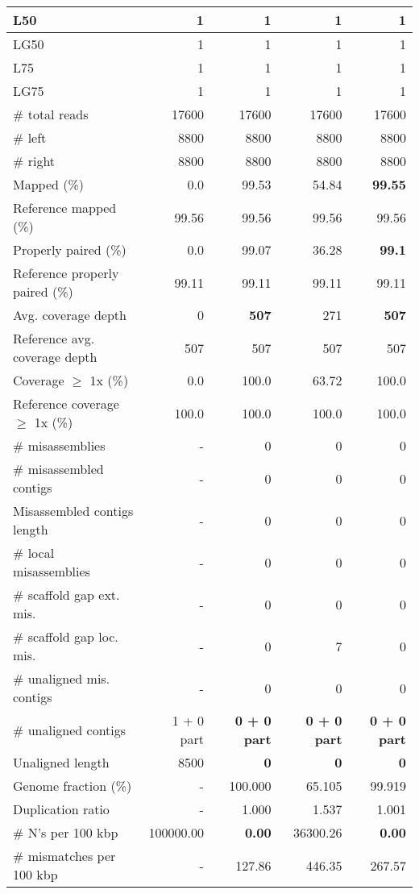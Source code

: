 \documentclass[12pt,a4paper]{article}
\begin{document}
\begin{table}[ht]
\begin{center}
\begin{tabular}{|l*{4}{|r}|}
L50 & 1 & 1 & 1 & 1 \\ \hline
LG50 & 1 & 1 & 1 & 1 \\ \hline
L75 & 1 & 1 & 1 & 1 \\ \hline
LG75 & 1 & 1 & 1 & 1 \\ \hline
\# total reads & 17600 & 17600 & 17600 & 17600 \\ \hline
\# left & 8800 & 8800 & 8800 & 8800 \\ \hline
\# right & 8800 & 8800 & 8800 & 8800 \\ \hline
Mapped (\%) & 0.0 & 99.53 & 54.84 & {\bf 99.55} \\ \hline
Reference mapped (\%) & 99.56 & 99.56 & 99.56 & 99.56 \\ \hline
Properly paired (\%) & 0.0 & 99.07 & 36.28 & {\bf 99.1} \\ \hline
Reference properly paired (\%) & 99.11 & 99.11 & 99.11 & 99.11 \\ \hline
Avg. coverage depth & 0 & {\bf 507} & 271 & {\bf 507} \\ \hline
Reference avg. coverage depth & 507 & 507 & 507 & 507 \\ \hline
Coverage $\geq$ 1x (\%) & 0.0 & 100.0 & 63.72 & 100.0 \\ \hline
Reference coverage $\geq$ 1x (\%) & 100.0 & 100.0 & 100.0 & 100.0 \\ \hline
\# misassemblies & - & 0 & 0 & 0 \\ \hline
\# misassembled contigs & - & 0 & 0 & 0 \\ \hline
Misassembled contigs length & - & 0 & 0 & 0 \\ \hline
\# local misassemblies & - & 0 & 0 & 0 \\ \hline
\# scaffold gap ext. mis. & - & 0 & 0 & 0 \\ \hline
\# scaffold gap loc. mis. & - & 0 & 7 & 0 \\ \hline
\# unaligned mis. contigs & - & 0 & 0 & 0 \\ \hline
\# unaligned contigs & 1 + 0 part & {\bf 0 + 0 part} & {\bf 0 + 0 part} & {\bf 0 + 0 part} \\ \hline
Unaligned length & 8500 & {\bf 0} & {\bf 0} & {\bf 0} \\ \hline
Genome fraction (\%) & - & 100.000 & 65.105 & 99.919 \\ \hline
Duplication ratio & - & 1.000 & 1.537 & 1.001 \\ \hline
\# N's per 100 kbp & 100000.00 & {\bf 0.00} & 36300.26 & {\bf 0.00} \\ \hline
\# mismatches per 100 kbp & - & 127.86 & 446.35 & 267.57 \\ \hline

\end{tabular}
\end{center}
\end{table}
\end{document}
